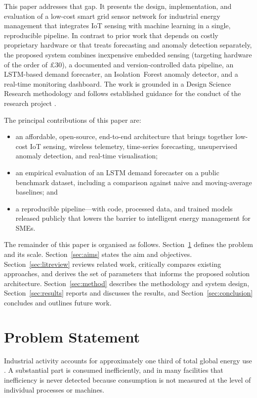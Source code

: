 \documentclass[conference]{IEEEtran}
\begin{document}
This paper addresses that gap. It presents the design, implementation, and
evaluation of a low-cost smart grid sensor network for industrial energy
management that integrates IoT sensing with machine learning in a single,
reproducible pipeline. In contrast to prior work that depends on costly
proprietary hardware or that treats forecasting and anomaly detection
separately, the proposed system combines inexpensive embedded sensing (targeting
hardware of the order of \pounds30), a documented and version-controlled data
pipeline, an LSTM-based demand forecaster, an Isolation~Forest anomaly detector,
and a real-time monitoring dashboard. The work is grounded in a Design Science
Research methodology \cite{hevner2004design,peffers2007design} and follows
established guidance for the conduct of the research project
\cite{zina2021essential}.

\noindent The principal contributions of this paper are:
\begin{itemize}
  \item an affordable, open-source, end-to-end architecture that brings together
        low-cost IoT sensing, wireless telemetry, time-series forecasting,
        unsupervised anomaly detection, and real-time visualisation;
  \item an empirical evaluation of an LSTM demand forecaster on a public
        benchmark dataset, including a comparison against naive and
        moving-average baselines; and
  \item a reproducible pipeline---with code, processed data, and trained models
        released publicly that lowers the barrier to intelligent energy
        management for SMEs.
\end{itemize}

The remainder of this paper is organised as follows. Section~\ref{sec:problem}
defines the problem and its scale. Section~\ref{sec:aims} states the aim and
objectives. Section~\ref{sec:litreview} reviews related work, critically
compares existing approaches, and derives the set of parameters that informs the
proposed solution architecture. Section~\ref{sec:method} describes the
methodology and system design, Section~\ref{sec:results} reports and discusses
the results, and Section~\ref{sec:conclusion} concludes and outlines future
work.

\section{Problem Statement}\label{sec:problem}
Industrial activity accounts for approximately one third of total global energy
use \cite{international2022international}. A substantial part is consumed
inefficiently, and in many facilities that inefficiency is never detected
because consumption is not measured at the level of individual processes or
machines.
 
\end{document}
